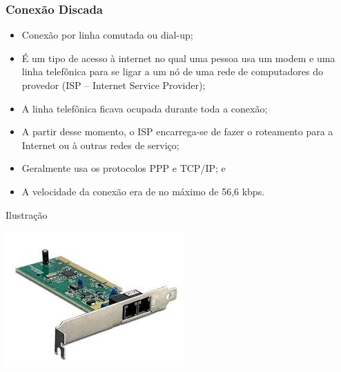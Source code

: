 \documentclass[aspectratio=169]{beamer} %
\begin{document}
\begin{frame}
	\frametitle{Conexão Discada}
			
	\begin{itemize}
		\item Conexão por linha comutada ou dial-up;
		\item É um tipo de acesso à internet no qual uma pessoa usa um modem e uma linha telefônica para se ligar a um nó de uma rede de computadores do provedor (ISP – Internet Service Provider);
		\item A linha telefônica ficava ocupada durante toda a conexão;
		\item A partir desse momento, o ISP encarrega-se de fazer o roteamento para a Internet ou à outras redes de serviço;
		\item Geralmente usa os protocolos PPP e TCP/IP; e
		\item A velocidade da conexão era de no máximo de 56,6 kbps.
	\end{itemize}\vfill
	
	\begin{exampleblock}{Ilustra\c cão}
		\begin{center}
			\includegraphics[scale=0.2]{img/faxmodem}
		\end{center}
	\end{exampleblock}
\end{frame}
\end{document}
